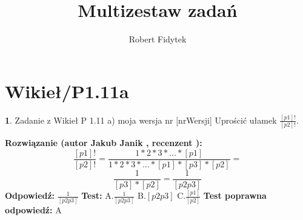\documentclass[12pt, a4paper]{article}
\title{Multizestaw zadań}
\author{Robert Fidytek}
\date{}
\theoremstyle{definition} %
\newtheorem{zad}{}
\newcommand{\kategoria}[1]{\section{#1}} %
\newcommand{\zadStart}[1]{\begin{zad}#1\newline} %
\newcommand{\zadStop}{\end{zad}}   %
\newcommand{\rozwStart}[2]{\noindent \textbf{Rozwiązanie (autor #1 , recenzent #2): }\newline} %
\newcommand{\rozwStop}{\newline}                                            %
\newcommand{\odpStart}{\noindent \textbf{Odpowiedź:}\newline}    %
\newcommand{\odpStop}{\newline}                                             %
\newcommand{\testStart}{\noindent \textbf{Test:}\newline} %
\newcommand{\testStop}{\newline} %
\newcommand{\kluczStart}{\noindent \textbf{Test poprawna odpowiedź:}\newline} %
\newcommand{\kluczStop}{\newline} %
\begin{document}
\maketitle


\kategoria{Wikieł/P1.11a}
\zadStart{Zadanie z Wikieł P 1.11 a) moja wersja nr [nrWersji]}
Uprościć ułamek $\frac{[p1]!}{[p2]!}$.
\zadStop
\rozwStart{Jakub Janik}{}
$$\frac{[p1]!}{[p2]!}=\frac{1*2*3*\dots*[p1]}{1*2*3*\dots*[p1]*[p3]*[p2]}= $$
$$\frac{1}{[p3]*[p2]}=\frac{1}{[p2p3]} $$
\rozwStop
\odpStart
$\frac{1}{[p2p3]}$
\odpStop
\testStart
A.$\frac{1}{[p2p3]}$
B.$[p2p3]$
C.$\frac{[p1]}{[p2]}$
\testStop
\kluczStart
A
\kluczStop
\end{document}
